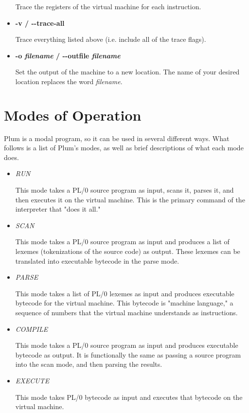 \documentclass[12pt]{memoir}
\begin{document}
\begin{itemize}
        Trace the registers of the virtual machine for each instruction.

    \item \textbf{-v / {-}{-}trace-all}

        Trace everything listed above (i.e. include all of the trace flags).

    \item \textbf{-o \emph{filename} / {-}{-}outfile \emph{filename}}

        Set the output of the machine to a new location. The name of your desired
        location replaces the word \emph{filename}.

\end{itemize}

\pagebreak

\section*{Modes of Operation}
Plum is a modal program, so it can be used in several different ways. What follows
is a list of Plum's modes, as well as brief descriptions of what each mode does.
\begin{itemize}
    \item \emph{RUN}

        This mode takes a PL/0 source program as input, scans it, parses it, and then
        executes it on the virtual machine. This is the primary command of the interpreter
        that "does it all."

    \item \emph{SCAN}

        This mode takes a PL/0 source program as input and produces a list of lexemes
        (tokenizations of the source code) as output. These lexemes can be translated
        into executable bytecode in the parse mode.

    \item \emph{PARSE}
        
        This mode takes a list of PL/0 lexemes as input and produces executable bytecode
        for the virtual machine. This bytecode is "machine language," a sequence of numbers
        that the virtual machine understands as instructions.

    \item \emph{COMPILE}

        This mode takes a PL/0 source program as input and produces executable bytecode
        as output. It is functionally the same as passing a source program into the scan
        mode, and then parsing the results.

    \item \emph{EXECUTE}

        This mode takes PL/0 bytecode as input and executes that bytecode on the virtual
        machine.
\end{itemize}
\end{document}
